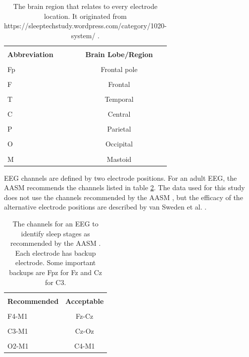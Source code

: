 \documentclass[12pt, oneside]{book}
\begin{document}
\begin{table}[H]
	{\hspace{0cm}
		\begin{tabular}{|p{5cm}|c|}
			\hline \\ [-1.5ex]
			\textbf{Abbreviation} & \textbf{Brain Lobe/Region} \\
			\hline \\ [-1.5ex]
			Fp & Frontal pole \\
			\hline \\ [-1.5ex]
			F & Frontal  \\
			\hline \\ [-1.5ex]
			T & Temporal \\
			\hline \\ [-1.5ex]
			C & Central \\
			\hline \\ [-1.5ex]
			P & Parietal \\
			\hline \\ [-1.5ex]
			O & Occipital \\
			\hline \\ [-1.5ex]
			M & Mastoid \\
			\hline
		\end{tabular}
	} 
	\caption{The brain region that relates to every electrode location. It originated from https://sleeptechstudy.wordpress.com/category/1020-system/ \cite{noauthor_10/20_nodate}.}
	\label{tab:1020letters}
\end{table}

EEG channels are defined by two electrode positions. For an adult EEG, the AASM recommends the channels listed in table \ref{tab:AASMchrec}. The data used for this study does not use the channels recommended by the AASM \cite{noauthor_sleep-edf_nodate}, but the efficacy of the alternative electrode positions are described by van Sweden et al. \cite{b_alternative_1990}. 

\begin{table}[H]
	{\hspace{0cm}
		\begin{tabular}{|p{5cm}|c|}
			\hline \\ [-1.5ex]
			\textbf{Recommended} & \textbf{Acceptable} \\
			\hline \\ [-1.5ex]
			F4-M1 & Fz-Cz \\
			\hline \\ [-1.5ex]
			C3-M1 & Cz-Oz  \\
			\hline \\ [-1.5ex]
			O2-M1 & C4-M1\\
			\hline
		\end{tabular}
	} 
	\caption{The channels for an EEG to identify sleep stages as recommended by the AASM \cite{berry_md_chair_aasm_nodate}. Each electrode has backup electrode. Some important backups are Fpz for Fz and Cz for C3.}
	\label{tab:AASMchrec}
\end{table}
\end{document}
